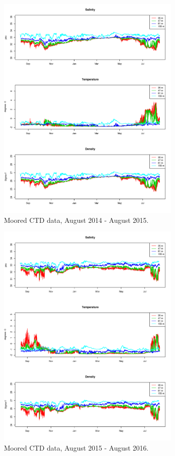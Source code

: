 \documentclass[12pt]{dforeport}
\begin{document}
\begin{figure}
\centering
\includegraphics[width = 0.8\textwidth]{./figures/08_mctd_2014_2015.png}
\caption[Moored CTD, August 2014-2015]{Moored CTD data, August 2014 - August 2015.}
\label{f:mctd_2014_2015}
\end{figure}

\begin{figure}
\centering
\includegraphics[width = 0.8\textwidth]{./figures/09_mctd_2015_2016.png}
\caption[Moored CTD, August 2015-2016]{Moored CTD data, August 2015 - August 2016.}
\label{f:mctd_2015_2016}
\end{figure}
\end{document}
